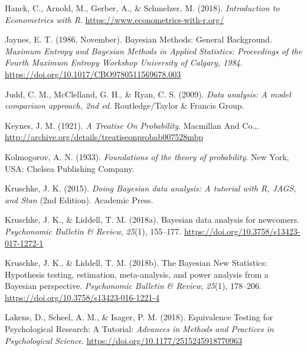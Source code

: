 \documentclass[
  a4paper,11pt,twoside,onecolumn,openright,final,oldfontcommands]{memoir}
\newlength{\cslhangindent}
\newlength{\cslentryspacingunit} %
\newenvironment{CSLReferences}[2] %
 {%
  \setlength{\parindent}{0pt}
  \ifodd #1
  \let\oldpar\par
  \def\par{\hangindent=\cslhangindent\oldpar}
  \fi
  \setlength{\parskip}{#2\cslentryspacingunit}
 }%
 {}
\theoremstyle{definition}
\theoremstyle{definition}
\theoremstyle{definition}
\theoremstyle{definition}
\theoremstyle{remark}
\begin{document}
\begin{CSLReferences}{1}{0}
\leavevmode{}%
Hanck, C., Arnold, M., Gerber, A., \& Schmelzer, M. (2018). \emph{Introduction to {Econometrics} with {R}}. \url{https://www.econometrics-with-r.org/}

\leavevmode{}%
Jaynes, E. T. (1986, November). Bayesian {Methods}: {General} {Background}. \emph{Maximum {Entropy} and {Bayesian} {Methods} in {Applied} {Statistics}: {Proceedings} of the {Fourth} {Maximum} {Entropy} {Workshop} {University} of {Calgary}, 1984}. \url{https://doi.org/10.1017/CBO9780511569678.003}

\leavevmode{}%
Judd, C. M., McClelland, G. H., \& Ryan, C. S. (2009). \emph{Data analysis: {A} model comparison approach, 2nd ed}. Routledge/Taylor \& Francis Group.

\leavevmode{}%
Keynes, J. M. (1921). \emph{A {Treatise} {On} {Probability}}. Macmillan And Co.,. \url{http://archive.org/details/treatiseonprobab007528mbp}

\leavevmode{}%
Kolmogorov, A. N. (1933). \emph{Foundations of the theory of probability}. New York, USA: Chelsea Publishing Company.

\leavevmode{}%
Kruschke, J. K. (2015). \emph{Doing {Bayesian} data analysis: A tutorial with {R}, {JAGS}, and {Stan}} (2nd Edition). Academic Press.

\leavevmode{}%
Kruschke, J. K., \& Liddell, T. M. (2018a). Bayesian data analysis for newcomers. \emph{Psychonomic Bulletin \& Review}, \emph{25}(1), 155--177. \url{https://doi.org/10.3758/s13423-017-1272-1}

\leavevmode{}%
Kruschke, J. K., \& Liddell, T. M. (2018b). The {Bayesian} {New} {Statistics}: {Hypothesis} testing, estimation, meta-analysis, and power analysis from a {Bayesian} perspective. \emph{Psychonomic Bulletin \& Review}, \emph{25}(1), 178--206. \url{https://doi.org/10.3758/s13423-016-1221-4}

\leavevmode{}%
Lakens, D., Scheel, A. M., \& Isager, P. M. (2018). Equivalence {Testing} for {Psychological} {Research}: {A} {Tutorial}: \emph{Advances in Methods and Practices in Psychological Science}. \url{https://doi.org/10.1177/2515245918770963}


\end{CSLReferences}
\end{document}
